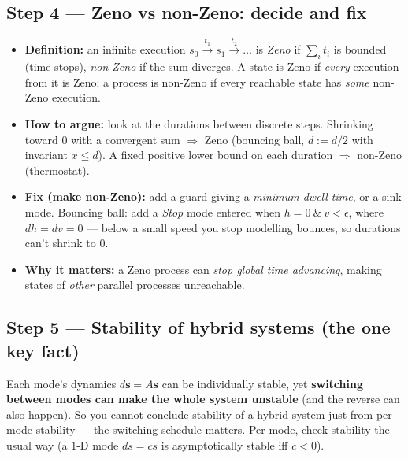 \subsection*{Step 4 --- Zeno vs non-Zeno: decide and fix}
\begin{itemize}
  \item \textbf{Definition:} an infinite execution $s_0\xrightarrow{t_1}s_1\xrightarrow{t_2}\dots$
        is \emph{Zeno} if $\sum_i t_i$ is bounded (time stops), \emph{non-Zeno} if the sum diverges.
        A state is Zeno if \emph{every} execution from it is Zeno; a process is non-Zeno if every
        reachable state has \emph{some} non-Zeno execution.
  \item \textbf{How to argue:} look at the durations between discrete steps. Shrinking toward $0$ with
        a convergent sum $\Rightarrow$ Zeno (bouncing ball, $d:=d/2$ with invariant $x\le d$).
        A fixed positive lower bound on each duration $\Rightarrow$ non-Zeno (thermostat).
  \item \textbf{Fix (make non-Zeno):} add a guard giving a \emph{minimum dwell time}, or a sink mode.
        Bouncing ball: add a \emph{Stop} mode entered when $h=0\ \&\ v<\epsilon$, where $dh=dv=0$ ---
        below a small speed you stop modelling bounces, so durations can't shrink to $0$.
  \item \textbf{Why it matters:} a Zeno process can \emph{stop global time advancing}, making states
        of \emph{other} parallel processes unreachable.
\end{itemize}

\subsection*{Step 5 --- Stability of hybrid systems (the one key fact)}
Each mode's dynamics $d\mathbf{s}=A\mathbf{s}$ can be individually stable, yet \textbf{switching
between modes can make the whole system unstable} (and the reverse can also happen). So you cannot
conclude stability of a hybrid system just from per-mode stability --- the switching schedule
matters. Per mode, check stability the usual way (a $1$-D mode $ds=cs$ is asymptotically stable iff
$c<0$).

